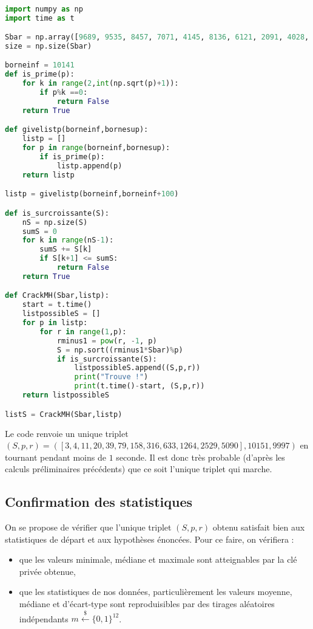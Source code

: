 \documentclass{article}
\begin{document}
\begin{lstlisting}[language = Python]

import numpy as np
import time as t

Sbar = np.array([9689, 9535, 8457, 7071, 4145, 8136, 6121, 2091, 4028, 8364, 6423, 7918])
size = np.size(Sbar)

borneinf = 10141
def is_prime(p):
    for k in range(2,int(np.sqrt(p)+1)):
        if p%k ==0:
            return False
    return True

def givelistp(borneinf,bornesup):
    listp = []
    for p in range(borneinf,bornesup):
        if is_prime(p):
            listp.append(p)
    return listp

listp = givelistp(borneinf,borneinf+100)

def is_surcroissante(S):
    nS = np.size(S)
    sumS = 0
    for k in range(nS-1):
        sumS += S[k]
        if S[k+1] <= sumS:
            return False
    return True

def CrackMH(Sbar,listp):
    start = t.time()
    listpossibleS = []
    for p in listp:
        for r in range(1,p):
            rminus1 = pow(r, -1, p)
            S = np.sort((rminus1*Sbar)%p)
            if is_surcroissante(S):
                listpossibleS.append((S,p,r))
                print("Trouve !")
                print(t.time()-start, (S,p,r))
    return listpossibleS

listS = CrackMH(Sbar,listp)

\end{lstlisting}

Le code renvoie un unique triplet $(S,p,r) = ([3, 4, 11, 20, 39, 79, 158, 316, 633, 1264, 2529, 5090], 10151, 9997)$ en tournant pendant moins de $1$ seconde. Il est donc très probable (d'après les calculs préliminaires précédents) que ce soit l'unique triplet qui marche.

\subsection{Confirmation des statistiques}

On se propose de vérifier que l'unique triplet $(S,p,r)$ obtenu satisfait bien aux statistiques de départ et aux hypothèses énoncées. Pour ce faire, on vérifiera :
\begin{itemize}
    \item que les valeurs minimale, médiane et maximale sont atteignables par la clé privée obtenue,
    \item que les statistiques de nos données, particulièrement les valeurs moyenne, médiane et d'écart-type sont reproduisibles par des tirages aléatoires indépendants $\displaystyle m\xleftarrow{\$}\{0,1\}^{12}$.
\end{itemize}
\end{document}

